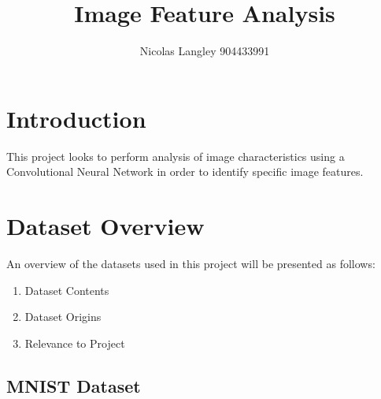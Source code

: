 \documentclass{article}
\begin{document}
 



\title{Image Feature Analysis}
\author{Nicolas Langley 904433991}
\maketitle
\section{Introduction}

This project looks to perform analysis of image characteristics using a Convolutional
Neural Network in order to identify specific image features.  

\section{Dataset Overview}

An overview of the datasets used in this project will be presented as follows:
\begin{enumerate}
  \item Dataset Contents
  \item Dataset Origins
  \item Relevance to Project
\end{enumerate}

\subsection{MNIST Dataset}
\end{document}
